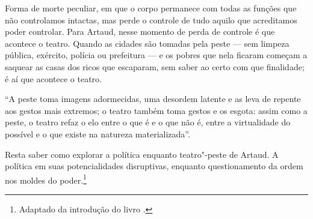 \begin{multicols}{2}
Forma de morte peculiar, em que o corpo permanece com todas as funções
que não controlamos intactas, mas perde o controle de tudo aquilo que
acreditamos poder controlar. Para Artaud, nesse momento de perda de
controle é que acontece o teatro. Quando as cidades são tomadas pela
peste --- sem limpeza pública, exército, polícia ou prefeitura ---
e os pobres que nela ficaram começam a saquear as casas dos ricos que
escaparam, sem saber ao certo com que finalidade; é aí que acontece o
teatro.

``A peste toma imagens adormecidas, uma desordem latente e as leva de
repente aos gestos mais extremos; o teatro também toma gestos e os
esgota: assim como a peste, o teatro refaz o elo entre o que é e o que
não é, entre a virtualidade do possível e o que existe na natureza
materializada''.

Resta saber como explorar a política enquanto teatro"-peste de Artaud. A
política em suas potencialidades disruptivas, enquanto questionamento da
ordem nos moldes do poder.\footnote[1]{Adaptado da introdução do livro {}.}
\end{multicols}
